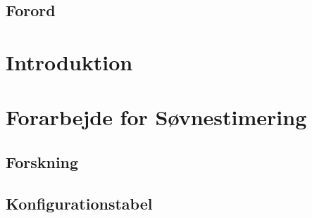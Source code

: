 %
%
%
%
% 



\pagestyle{empty} %
%
%

\newpage

\cleardoublepage

\section*{Forord}

\cleardoublepage

\renewcommand{\contentsname}{Indholdsfortegnelse}
\pagestyle{fancy} %
\setcounter{tocdepth}{1}
\tableofcontents
%
\cleardoublepage

\chapter{Introduktion}


\chapter{Forarbejde for Søvnestimering}\label{chap:forarbejdsoevn}

\section{Forskning}

\section{Konfigurationstabel}

